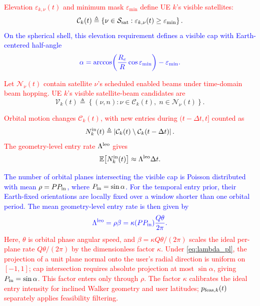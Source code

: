 \documentclass[10pt,letterpaper,journal]{IEEEtran}
\newcommand{\revnew}[1]{\textcolor{red}{#1}}
\begin{document}
\revnew{Elevation $\varepsilon_{k,\nu}(t)$ and minimum mask $\varepsilon_{\min}$ define UE $k$'s visible satellites:}
\begin{equation}
\mathcal C_k(t)
\triangleq
\left\{
\nu\in\mathcal S_{\rm sat}:
\varepsilon_{k,\nu}(t)\ge \varepsilon_{\min}
\right\}.
\label{eq:visible_satellite_set}
\end{equation}
\textcolor{blue}{On the spherical shell, this elevation requirement defines a visible cap with Earth-centered half-angle}
\begin{equation}
\textcolor{blue}{
\alpha
=\arccos\!\left(\frac{R_e}{R}\cos\varepsilon_{\min}\right)
-\varepsilon_{\min}.}    
\label{half_angle}
\end{equation}

\revnew{Let $\mathcal N_\nu(t)$ contain satellite $\nu$'s scheduled enabled beams under time-domain beam hopping. UE $k$'s visible satellite-beam candidates are}
\begin{equation}
\mathcal V_k(t)
\triangleq
\left\{
(\nu,n):
\nu\in\mathcal C_k(t),\;
n\in\mathcal N_\nu(t)
\right\}.
\label{eq:visible_beam_candidate_set}
\end{equation}

\revnew{Orbital motion changes $\mathcal C_k(t)$, with new entries during $(t-\Delta t,t]$ counted as}
\begin{equation}
N^{\rm in}_{k}(t)
\triangleq
\left|
\mathcal C_k(t)
\setminus
\mathcal C_k(t-\Delta t)
\right|.
\label{eq:new_visible_satellite_count}
\end{equation}
\revnew{The geometry-level entry rate $\Lambda^{\rm leo}$ gives}
\begin{equation}
\mathbb E\!\left[
N^{\rm in}_{k}(t)
\right]
\approx
\Lambda^{\rm leo}\Delta t .
\label{eq:leo_entry_intensity}
\end{equation}

\textcolor{blue}{The number of orbital planes intersecting the visible cap is Poisson distributed with mean $\rho=PP_{\rm in}$, where $P_{\rm in}=\sin\alpha$.
For the temporal entry prior, their Earth-fixed orientations are locally fixed over a window shorter than one orbital period.
The mean geometry-level entry rate is then given by}
\begin{equation}
\textcolor{blue}{
\Lambda^{\rm leo}
=\rho\beta
=\kappa(PP_{\rm in})\frac{Q\theta}{2\pi}.
}
\label{eq:Lambda_leo_form}
\end{equation}
\revnew{Here, $\theta$ is orbital phase angular speed, and $\beta=\kappa Q\theta/(2\pi)$ scales the ideal per-plane rate $Q\theta/(2\pi)$ by the dimensionless factor $\kappa$.}
\revnew{Under \eqref{eq:lambda_pl}, the projection of a unit plane normal onto the user's radial direction is uniform on $[-1,1]$; cap intersection requires absolute projection at most $\sin\alpha$, giving $P_{\rm in}=\sin\alpha$. This factor enters only through $\rho$. The factor $\kappa$ calibrates the ideal entry intensity for inclined Walker geometry and user latitudes; $p_{{\rm feas},k}(t)$ separately applies feasibility filtering.}
\end{document}
